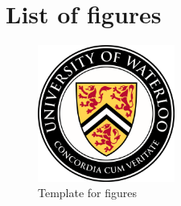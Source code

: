 \chapter{List of figures}
\begin{figure}
    \centering
    \includegraphics[width=0.4\textwidth]{assets/uw.png}
    \caption{Template for figures}
    \label{fig:template}
\end{figure}